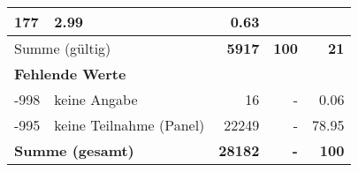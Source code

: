 \begin{longtable}{lXrrr}
       \num{177} &
       \num[round-mode=places,round-precision=2]{2.99} &
         \num[round-mode=places,round-precision=2]{0.63} \\
     \midrule
     \multicolumn{2}{l}{Summe (gültig)} &
       \textbf{\num{5917}} &
     \textbf{100} &
       \textbf{\num[round-mode=places,round-precision=2]{21}} \\
     \multicolumn{5}{l}{\textbf{Fehlende Werte}}\\
       -998 &
       keine Angabe &
         \num{16} &
        - &
         \num[round-mode=places,round-precision=2]{0.06} \\
       -995 &
       keine Teilnahme (Panel) &
         \num{22249} &
        - &
         \num[round-mode=places,round-precision=2]{78.95} \\
     \midrule
     \multicolumn{2}{l}{\textbf{Summe (gesamt)}} &
          \textbf{\num{28182}} &
        \textbf{-} &
        \textbf{100} \\
     \bottomrule
     \end{longtable}
     
